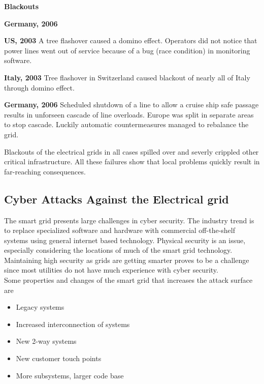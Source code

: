 \begin{tcolorbox}
    \textbf{Blackouts}
    \begin{labeling}{\textbf{Germany, 2006}}
    \item [\textbf{US, 2003}]
        A tree flashover caused a domino effect.
        Operators did not notice that power lines went out of service because of a bug (race condition) in monitoring software.
    \item [\textbf{Italy, 2003}]
        Tree flashover in Switzerland caused blackout of nearly all of Italy through domino effect.
    \item [\textbf{Germany, 2006}]
    Scheduled shutdown of a line to allow a cruise ship safe passage results in unforseen cascade of line overloads.
        Europe was split in separate areas to stop cascade.
        Luckily automatic countermeasures managed to rebalance the grid.
    \end{labeling}

Blackouts of the electrical grids in all cases spilled over and severly crippled other critical infrastructure.
All these failures show that local problems quickly result in far-reaching consequences.
\end{tcolorbox}

\subsection{Cyber Attacks Against the Electrical grid}
The smart grid presents large challenges in cyber security.
The industry trend is to replace specialized software and hardware with commercial off-the-shelf systems using general internet based technology.
Physical security is an issue, especially considering the locations of much of the smart grid technology.
Maintaining high security as grids are getting smarter proves to be a challenge since most utilities do not have much experience with cyber security.\\

Some properties and changes of the smart grid that increases the attack surface are
\begin{itemize}
    \item Legacy systems
    \item Increased interconnection of systems
    \item New 2-way systems
    \item New customer touch points
    \item More subsystems, larger code base
\end{itemize}

